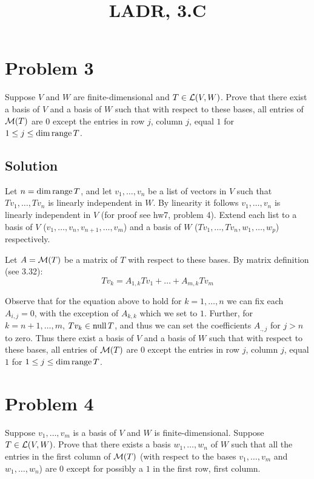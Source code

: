 \documentclass{article}
\title{LADR, 3.C}
\begin{document}
\maketitle

\section*{Problem 3}
Suppose $V$ and $W$ are finite-dimensional and $T\in\L(V,W)$. Prove that there exist a basis of $V$ and a basis of $W$ such that with respect to these bases, all entries of $\M(T)$ are $0$ except the entries in row $j$, column $j$, equal $1$ for $1\leq j\leq \dim\text{range}\, T$.

\subsection*{Solution}
Let $n=\dim\text{range}\, T$, and let $v_1, \ldots, v_n$ be a list of vectors in $V$ such that $Tv_1,\ldots,Tv_n$ is linearly independent in $W$. By linearity it follows $v_1, \ldots, v_n$ is linearly independent in $V$ (for proof see hw7, problem 4). Extend each list to a basis of $V$ ($v_1, \ldots, v_n, v_{n+1}, \ldots, v_m$) and a basis of $W$ ($Tv_1,\ldots,Tv_n, w_1,\ldots,w_p$) respectively.

\vs

Let $A=\M(T)$ be a matrix of $T$ with respect to these bases. By matrix definition (see 3.32):
\[Tv_k=A_{1,k}Tv_1+\ldots+A_{m,k}Tv_m\]

Observe that for the equation above to hold for $k=1,\ldots,n$ we can fix each $A_{i,j}=0$, with the exception of $A_{k,k}$ which we set to $1$. Further, for $k=n+1,\ldots,m$, $Tv_k\in\text{null}\, T$, and thus we can set the coefficients $A_{.,j}$ for $j>n$ to zero. Thus there exist a basis of $V$ and a basis of $W$ such that with respect to these bases, all entries of $\M(T)$ are $0$ except the entries in row $j$, column $j$, equal $1$ for $1\leq j\leq \dim\text{range}\, T$.

\section*{Problem 4}
Suppose $v_1,\ldots,v_m$ is a basis of $V$ and $W$ is finite-dimensional. Suppose $T\in\L(V,W)$. Prove that there exists a basis $w_1,\ldots,w_n$ of $W$ such that all the entries in the first column of $\M(T)$ (with respect to the bases $v_1,\ldots,v_m$ and $w_1,\ldots,w_n$) are $0$ except for possibly a $1$ in the first row, first column.
\end{document}

